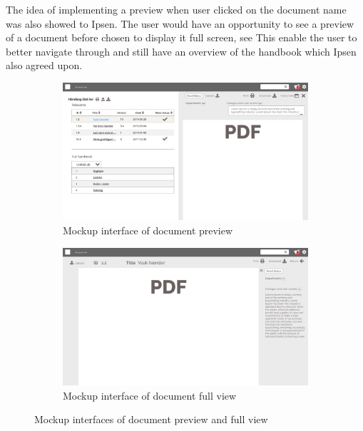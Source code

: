 The idea of implementing a preview when user clicked on the document name was also showed to Ipsen. 
The user would have an opportunity to see a preview of a document before chosen to display it full screen, see 
This enable the user to better navigate through and still have an overview of the handbook which Ipsen also agreed upon.

\begin{figure}[H]
	\centering
	\begin{subfigure}[b]{0.48\textwidth}
		\includegraphics[width=\textwidth]{billeder/PreviewVersion.jpg}
		\caption{Mockup interface of document preview}
	\end{subfigure}
	\quad
	\begin{subfigure}[b]{0.48\textwidth}
		\includegraphics[width=\textwidth]{billeder/FullView.jpg}
		\caption{Mockup interface of document full view}
	\end{subfigure}
	\caption{Mockup interfaces of document preview and full view}\label{fig:mockupPreview}
\end{figure}

